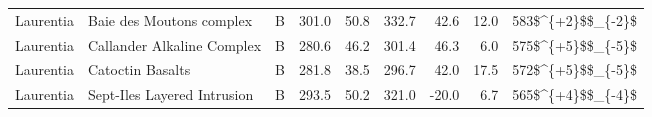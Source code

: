 \begin{longtable}{p{1 in}p{1 in}rrrrrrr}
                     Laurentia &                           Baie des Moutons complex &      B &     301.0 &      50.8 & 332.7 &  42.6 &      12.0 &      583\$\textasciicircum \{+2\}\$\$\_\{-2\}\$ \\
                     Laurentia &                         Callander Alkaline Complex &      B &     280.6 &      46.2 & 301.4 &  46.3 &       6.0 &      575\$\textasciicircum \{+5\}\$\$\_\{-5\}\$ \\
                     Laurentia &                                   Catoctin Basalts &      B &     281.8 &      38.5 & 296.7 &  42.0 &      17.5 &      572\$\textasciicircum \{+5\}\$\$\_\{-5\}\$ \\
                     Laurentia &                        Sept-Iles Layered Intrusion &      B &     293.5 &      50.2 & 321.0 & -20.0 &       6.7 &      565\$\textasciicircum \{+4\}\$\$\_\{-4\}\$ \\
\end{longtable}
